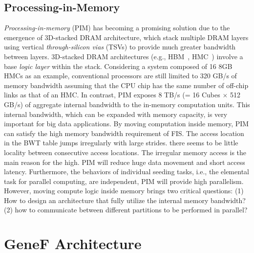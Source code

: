 \documentclass[9pt,conference]{IEEEtran}
\begin{document}
\subsection{Processing-in-Memory}
\textit{Processing-in-memory} (PIM) has becoming a promising solution due to the emergence of 3D-stacked DRAM architecture, which stack multiple DRAM layers using vertical \textit{through-silicon vias} (TSVs) to provide much greater bandwidth between layers. 3D-stacked DRAM architectures (e.g., HBM~\cite{3Dstacking}, HMC~\cite{3Dstacking}) involve a base \textit{logic layer} within the stack. Considering a system composed of 16 8GB HMCs as an example, conventional processors are still limited to 320 GB/s of memory bandwidth assuming that the CPU chip has the same number of off-chip links as that of an HMC. In contrast, PIM exposes 8 TB/s (= 16 Cubes $\times$ 512 GB/s) of aggregate internal bandwidth to the in-memory computation units. This internal bandwidth, which can be expanded with memory capacity, is very important for big data applications. By moving computation inside memory, PIM can satisfy the high memory bandwidth requirement of FIS. The access location in the BWT table jumps irregularly with large strides. there seems to be little locality between consecutive access locations. The irregular memory access is the main reason for the high. PIM will reduce huge data movement and short access latency. Furthermore, the behaviors of individual seeding tasks, i.e., the elemental task for parallel computing, are independent, PIM will provide high parallelism. However, moving compute logic inside memory brings two critical questions: (1) How to design an architecture that fully utilize the internal memory bandwidth? (2) how to communicate between different partitions to be performed in parallel?

\section{GeneF Architecture}
\label{sec:arch}
\end{document}
